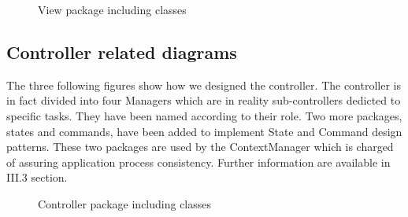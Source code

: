 \documentclass[paper=a4,fontsize=11pt]{report}
\numberwithin{equation}{section}		%
\numberwithin{figure}{section}		%
\numberwithin{table}{section}		%
\begin{document}
\begin{figure}[H]
\noindent{}
\caption{View package including classes}
\end{figure}

\subsection{Controller related diagrams}
\label{subsec:controller-related-diagrams}

The three following figures show how we designed the controller. The controller is in fact divided into four Managers which are in reality sub-controllers dedicted to specific tasks. They have been named according to their role. Two more packages, states and commands, have been added to implement State and Command design patterns. These two packages are used by the ContextManager which is charged of assuring application process consistency. Further information are available in III.3 section.  

\begin{figure}[H]
\centering
\noindent{}
\caption{Controller package including classes}
\end{figure}
\end{document}
